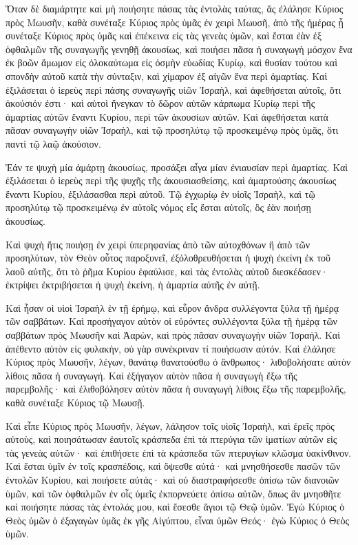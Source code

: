 {\par }{\PP {}Ὅταν δὲ διαμάρτητε καὶ μὴ ποιήσητε πάσας τὰς ἐντολὰς ταύτας, ἅς ἐλάλησε Κύριος πρὸς Μωυσῆν,
καθὰ συνέταξε Κύριος πρὸς ὑμᾶς ἐν χειρὶ Μωυσῆ, ἀπὸ τῆς ἡμέρας ᾗ συνέταξε Κύριος πρὸς ὑμᾶς καὶ ἐπέκεινα εἰς τὰς γενεὰς ὑμῶν,
καὶ ἔσται ἐὰν ἐξ ὀφθαλμῶν τῆς συναγωγῆς γενηθῇ ἀκουσίως, καὶ ποιήσει πᾶσα ἡ συναγωγὴ μόσχον ἕνα ἐκ βοῶν ἄμωμον εἰς ὁλοκαύτωμα εἰς ὀσμὴν εὐωδίας Κυρίῳ, καὶ θυσίαν τούτου καὶ σπονδὴν αὐτοῦ κατὰ τὴν σύνταξιν, καὶ χίμαρον ἐξ αἰγῶν ἕνα περὶ ἁμαρτίας.
Καὶ ἐξιλάσεται ὁ ἱερεὺς περὶ πάσης συναγωγῆς υἱῶν Ἰσραὴλ, καὶ ἀφεθήσεται αὐτοῖς, ὅτι ἀκούσιόν ἐστι· καὶ αὐτοὶ ἤνεγκαν τὸ δῶρον αὐτῶν κάρπωμα Κυρίῳ περὶ τῆς ἁμαρτίας αὐτῶν ἔναντι Κυρίου, περὶ τῶν ἀκουσίων αὐτῶν.
Καὶ ἀφεθήσεται κατὰ πᾶσαν συναγωγὴν υἱῶν Ἰσραὴλ, καὶ τῷ προσηλύτῳ τῷ προσκειμένῳ πρὸς ὑμᾶς, ὅτι παντὶ τῷ λαῷ ἀκούσιον.
\par }{\PP {}Ἐάν τε ψυχὴ μία ἁμάρτῃ ἀκουσίως, προσάξει αἶγα μίαν ἐνιαυσίαν περὶ ἁμαρτίας.
Καὶ ἐξιλάσεται ὁ ἱερεὺς περὶ τῆς ψυχῆς τῆς ἀκουσιασθείσης, καὶ ἁμαρτούσης ἀκουσίως ἔναντι Κυρίου, ἐξιλάσασθαι περὶ αὐτοῦ.
Τῷ ἐγχωρίῳ ἐν υἱοῖς Ἰσραὴλ, καὶ τῷ προσηλύτῳ τῷ προσκειμένῳ ἐν αὐτοῖς νόμος εἷς ἔσται αὐτοῖς, ὃς ἐὰν ποιήσῃ ἀκουσίως.
\par }{\PP {}Καὶ ψυχὴ ἥτις ποιήσῃ ἐν χειρὶ ὑπερηφανίας ἀπὸ τῶν αὐτοχθόνων ἢ ἀπὸ τῶν προσηλύτων, τὸν Θεὸν οὗτος παροξυνεῖ, ἐξόλοθρευθήσεται ἡ ψυχὴ ἐκείνη ἐκ τοῦ λαοῦ αὐτῆς,
ὅτι τὸ ῥῆμα Κυρίου ἐφαύλισε, καὶ τὰς ἐντολὰς αὐτοῦ διεσκέδασεν· ἐκτρίψει ἐκτριβήσεται ἡ ψυχὴ ἐκείνη, ἡ ἁμαρτία αὐτῆς ἐν αὐτῇ.
\par }{\PP {}Καὶ ἦσαν οἱ υἱοὶ Ἰσραὴλ ἑν τῇ ἐρήμῳ, καὶ εὗρον ἄνδρα συλλέγοντα ξύλα τῇ ἡμέρᾳ τῶν σαββάτων.
Καὶ προσήγαγον αὐτὸν οἱ εὐρόντες συλλέγοντα ξύλα τῇ ἡμέρᾳ τῶν σαββάτων πρὸς Μωυσῆν καὶ Ἀαρὼν, καὶ πρὸς πᾶσαν συναγωγὴν υἱῶν Ἰσραήλ.
Καὶ ἀπέθεντο αὐτὸν εἰς φυλακὴν, οὐ γὰρ συνέκριναν τί ποιήσωσιν αὐτόν.
Καὶ ἐλάλησε Κύριος πρὸς Μωυσῆν, λέγων, θανάτῳ θανατούσθω ὁ ἄνθρωπος· λιθοβολήσατε αὐτὸν λίθοις πᾶσα ἡ συναγωγή.
Καὶ ἐξήγαγον αὐτὸν πᾶσα ἡ συναγωγὴ ἔξω τῆς παρεμβολῆς· καὶ ἐλιθοβόλησεν αὐτὸν πᾶσα ἡ συναγωγὴ λίθοις ἔξω τῆς παρεμβολῆς, καθὰ συνέταξε Κύριος τῷ Μωυσῇ.
\par }{\PP {}Καὶ εἶπε Κύριος πρὸς Μωυσῆν, λέγων,
λάλησον τοῖς υἱοῖς Ἰσραὴλ, καὶ ἐρεῖς πρὸς αὐτοὺς, καὶ ποιησάτωσαν ἐαυτοῖς κράσπεδα ἐπὶ τὰ πτερύγια τῶν ἱματίων αὐτῶν εἰς τὰς γενεὰς αὐτῶν· καὶ ἐπιθήσετε ἐπὶ τὰ κράσπεδα τῶν πτερυγίων κλῶσμα ὑακίνθινον.
Καὶ ἔσται ὑμῖν ἐν τοῖς κρασπέδοις, καὶ ὄψεσθε αὐτά· καὶ μνησθήσεσθε πασῶν τῶν ἐντολῶν Κυρίου, καὶ ποιήσετε αὐτάς· καὶ οὐ διαστραφήσεσθε ὀπίσω τῶν διανοιῶν ὑμῶν, καὶ τῶν ὀφθαλμῶν ἐν οἷς ὑμεῖς ἐκπορνεύετε ὀπίσω αὐτῶν, ὅπως ἂν μνησθῆτε καὶ ποιήσητε πάσας τὰς ἐντολάς μου,
καὶ ἔσεσθε ἅγιοι τῷ Θεῷ ὑμῶν.
Ἐγὼ Κύριος ὁ Θεὸς ὑμῶν ὁ ἐξαγαγὼν ὑμᾶς ἐκ γῆς Αἰγύπτου, εἶναι ὑμῶν Θεός· ἐγὼ Κύριος ὁ Θεὸς ὑμῶν.

}
